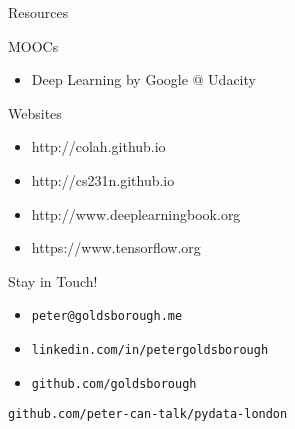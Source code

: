 

\begin{slide}{Resources}
  \begin{itemize}
    \pitem MOOCs
    \begin{itemize}
      \item Deep Learning by Google @ Udacity
    \end{itemize}
    \pitem Websites
    \begin{itemize}
      \item http://colah.github.io
      \item http://cs231n.github.io
      \item http://www.deeplearningbook.org
      \item https://www.tensorflow.org
    \end{itemize}
  \end{itemize}
\end{slide}

\begin{slide}{}
  {\huge Stay in Touch!}\\
  \vspace{1cm}
  \begin{itemize}
    \item \texttt{peter@goldsborough.me}
    \item \texttt{linkedin.com/in/petergoldsborough}
    \item \texttt{github.com/goldsborough}
  \end{itemize}

  \pause
  \vspace{1cm}
  \texttt{github.com/peter-can-talk/pydata-london}
\end{slide}

